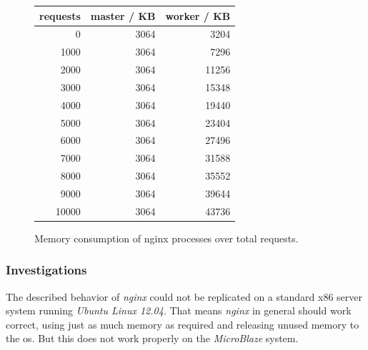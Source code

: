 \begin{figure}[H]
\begin{minipage}{0.4\textwidth}
\begin{tabular}{|r|r|r|}
    \hline
     \textbf{requests} & \textbf{master / KB} & \textbf{worker / KB} \\
    \hline
    0     & 3064  & 3204 \\
    1000  & 3064  & 7296 \\
    2000  & 3064  & 11256 \\
    3000  & 3064  & 15348 \\
    4000  & 3064  & 19440 \\
    5000  & 3064  & 23404 \\
    6000  & 3064  & 27496 \\
    7000  & 3064  & 31588 \\
    8000  & 3064  & 35552 \\
    9000  & 3064  & 39644 \\
    10000 & 3064  & 43736 \\
    \hline
    \end{tabular}
\end{minipage}
\begin{minipage}{0.60\textwidth}
	\centering
\end{minipage}
  \caption{Memory consumption of nginx processes over total requests.}
  \label{fig:nginx-mem}
\end{figure}

\subsubsection{Investigations}

The described behavior of \textit{nginx} could not be replicated on a standard x86 server system running \textit{Ubuntu Linux 12.04}. That means \textit{nginx} in general should work correct, using just as much memory as required and releasing unused memory to the \gls{os}. But this does not work properly on the \textit{MicroBlaze} system.

